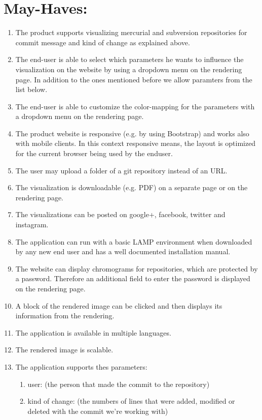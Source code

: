 \documentclass[12pt]{scrartcl}
\begin{document}
\section{May-Haves:}
\begin{enumerate}
\item The product supports visualizing mercurial and subversion repositories for commit message and kind of change as explained above.
\item The end-user is able to select which parameters he wants to influence the visualization on the website by using a dropdown menu on the rendering page. In addition to the ones mentioned before we allow paramters from the list below.
\item The end-user is able to customize the color-mapping for the parameters with  a dropdown menu on the rendering page.
\item The product website is responsive (e.g. by using Bootstrap) and works also with mobile clients. In this context responsive means, the layout is optimized for the current browser being used by the enduser.
\item The user may upload a folder of a git repository instead of an URL.
\item The visualization is downloadable (e.g. PDF) on a separate page or on the rendering page.
\item The visualizations can be posted on google+, facebook, twitter and instagram.
\item The application can run with a basic LAMP environment when downloaded by any new end user and has a well documented installation manual.
\item The website can display chromograms for repositories, which are protected by a password. Therefore an additional field to enter the password is displayed on the rendering page.
\item A block of the rendered image can be clicked and then displays its information from the rendering.
\item The application is available in multiple languages.
\item The rendered image is scalable.
\item The application supports thes parameters:
\begin{enumerate}
\item user: 
(the person that made the commit to the repository)
\item kind of change:  
(the numbers of lines that were added, modified or deleted with the commit we're working with)

\end{enumerate}
\end{enumerate}
\end{document}
